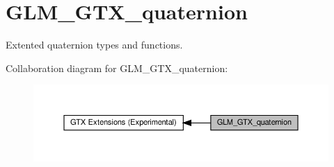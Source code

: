 \hypertarget{group__gtx__quaternion}{}\section{G\+L\+M\+\_\+\+G\+T\+X\+\_\+quaternion}
\label{group__gtx__quaternion}


Extented quaternion types and functions.  


Collaboration diagram for G\+L\+M\+\_\+\+G\+T\+X\+\_\+quaternion\+:\nopagebreak
\begin{figure}[H]
\begin{center}
\leavevmode
\includegraphics[width=350pt]{group__gtx__quaternion}
\end{center}
\end{figure}
